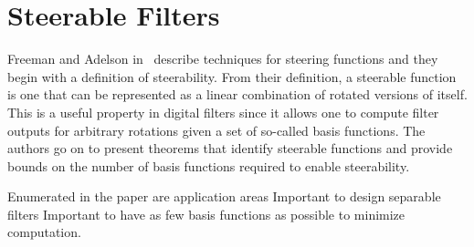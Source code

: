 \documentclass[letterpaper]{article}
\date{\today}
\begin{document}
\maketitle

\section{Steerable Filters}
Freeman and Adelson in~\cite{steer-filters} describe techniques for
steering functions and they begin with a definition of steerability.
From their definition, a steerable function is one that can be
represented as a linear combination of rotated versions of itself.
This is a useful property in digital filters since it allows one to
compute filter outputs for arbitrary rotations given a set of
so-called basis functions.  The authors go on to present
theorems that identify steerable functions and provide bounds on the
number of basis functions required to enable steerability.





Enumerated in the paper are application areas
Important to design separable filters
Important to have as few basis functions as possible to minimize computation.





\end{document}
